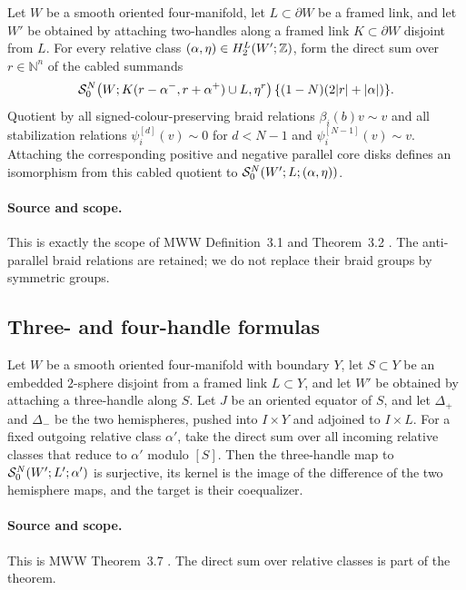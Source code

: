 \begin{externalresult}\label{prop:mww-3.2}
Let $W$ be a smooth oriented four-manifold, let $L\subset\partial W$ be a
framed link, and let $W'$ be obtained by attaching two-handles along a framed
link $K\subset\partial W$ disjoint from $L$.  For every relative class
$(\alpha,\eta)\in H_2^L(W';\mathbb{Z})$, form the direct sum over $r\in\mathbb N^n$ of the
cabled summands
\[
 \mathcal{S}^{N}_{0}\!\left(W;K(r-\alpha^-,r+\alpha^+)\cup L,\eta^r\right)
 \{(1-N)(2|r|+|\alpha|)\}.
\]
Quotient by all signed-colour-preserving braid relations
$\beta_i(b)v\sim v$ and all stabilization relations
$\psi_i^{[d]}(v)\sim0$ for $d<N-1$ and
$\psi_i^{[N-1]}(v)\sim v$.  Attaching the corresponding positive and
negative parallel core disks defines an isomorphism from this cabled quotient
to $\mathcal{S}^{N}_{0}(W';L;(\alpha,\eta))$.
\end{externalresult}

\paragraph{Source and scope.}
This is exactly the scope of MWW Definition~3.1 and Theorem~3.2
\cite[Definition~3.1 and Theorem~3.2]{ManolescuWalkerWedrich2023}.
The anti-parallel braid relations are retained; we do not replace their
braid groups by symmetric groups.

\subsection{Three- and four-handle formulas}

\begin{externalresult}\label{prop:mww-3.7}
Let $W$ be a smooth oriented four-manifold with boundary $Y$, let
$S\subset Y$ be an embedded $2$-sphere disjoint from a framed link
$L\subset Y$, and let $W'$ be obtained by attaching a three-handle along
$S$.  Let $J$ be an oriented equator of $S$, and let $\Delta_+$ and
$\Delta_-$ be the two hemispheres, pushed into $I\times Y$ and adjoined to
$I\times L$.  For a fixed outgoing relative class $\alpha'$, take the direct
sum over all incoming relative classes that reduce to $\alpha'$ modulo
$[S]$.  Then the three-handle map to
$\mathcal{S}^{N}_{0}(W';L';\alpha')$ is surjective, its kernel is the image of the
difference of the two hemisphere maps, and the target is their coequalizer.
\end{externalresult}

\paragraph{Source and scope.}
This is MWW Theorem~3.7 \cite[Theorem~3.7]{ManolescuWalkerWedrich2023}.
The direct sum over relative classes is part of the theorem.

